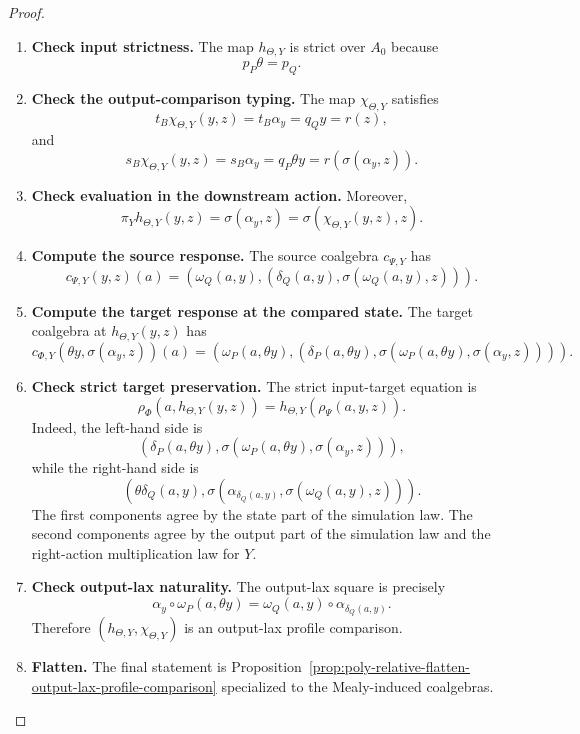 \begin{proof}
\leavevmode
\begin{enumerate}
\item \textbf{Check input strictness.}
The map \(h_{\Theta,Y}\) is strict over \(A_0\) because
\[
p_P\theta=p_Q.
\]

\item \textbf{Check the output-comparison typing.}
The map \(\chi_{\Theta,Y}\) satisfies
\[
t_B\chi_{\Theta,Y}(y,z)=t_B\alpha_y=q_Qy=r(z),
\]
and
\[
s_B\chi_{\Theta,Y}(y,z)=s_B\alpha_y=q_P\theta y
=
r(\sigma(\alpha_y,z)).
\]

\item \textbf{Check evaluation in the downstream action.}
Moreover,
\[
\pi_Yh_{\Theta,Y}(y,z)=\sigma(\alpha_y,z)
=
\sigma(\chi_{\Theta,Y}(y,z),z).
\]

\item \textbf{Compute the source response.}
The source coalgebra \(c_{\Psi,Y}\) has
\[
c_{\Psi,Y}(y,z)(a)
=
\left(
\omega_Q(a,y),
\left(
\delta_Q(a,y),
\sigma(\omega_Q(a,y),z)
\right)
\right).
\]

\item \textbf{Compute the target response at the compared state.}
The target coalgebra at \(h_{\Theta,Y}(y,z)\) has
\[
c_{\Phi,Y}(\theta y,\sigma(\alpha_y,z))(a)
=
\left(
\omega_P(a,\theta y),
\left(
\delta_P(a,\theta y),
\sigma(\omega_P(a,\theta y),\sigma(\alpha_y,z))
\right)
\right).
\]

\item \textbf{Check strict target preservation.}
The strict input-target equation is
\[
\rho_{\Phi}(a,h_{\Theta,Y}(y,z))
=
h_{\Theta,Y}(\rho_{\Psi}(a,y,z)).
\]
Indeed, the left-hand side is
\[
\left(
\delta_P(a,\theta y),
\sigma(\omega_P(a,\theta y),\sigma(\alpha_y,z))
\right),
\]
while the right-hand side is
\[
\left(
\theta\delta_Q(a,y),
\sigma(\alpha_{\delta_Q(a,y)},\sigma(\omega_Q(a,y),z))
\right).
\]
The first components agree by the state part of the simulation law.  The second
components agree by the output part of the simulation law and the right-action
multiplication law for \(Y\).

\item \textbf{Check output-lax naturality.}
The output-lax square is precisely
\[
\alpha_y\circ\omega_P(a,\theta y)
=
\omega_Q(a,y)\circ\alpha_{\delta_Q(a,y)}.
\]
Therefore \((h_{\Theta,Y},\chi_{\Theta,Y})\) is an output-lax profile
comparison.

\item \textbf{Flatten.}
The final statement is
Proposition~\ref{prop:poly-relative-flatten-output-lax-profile-comparison}
specialized to the Mealy-induced coalgebras.
\end{enumerate}
\end{proof}

